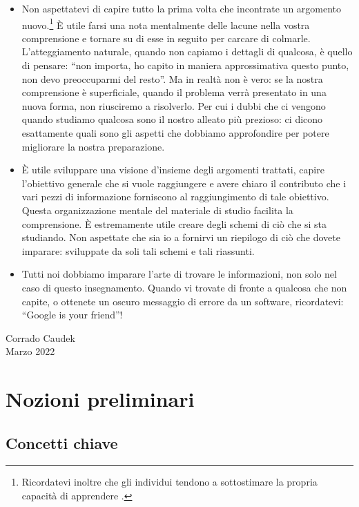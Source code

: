 \documentclass[
  11pt,
]{krantz}
\theoremstyle{definition}
\theoremstyle{definition}
\theoremstyle{definition}
\theoremstyle{definition}
\theoremstyle{remark}
\begin{document}
\begin{itemize}
\item
  Non aspettatevi di capire tutto la prima volta che incontrate un argomento nuovo.\footnote{Ricordatevi inoltre che gli individui tendono a sottostimare la propria capacità di apprendere \citep{horn2021underestimating}.} È utile farsi una nota mentalmente delle lacune nella vostra comprensione e tornare su di esse in seguito per carcare di colmarle. L'atteggiamento naturale, quando non capiamo i dettagli di qualcosa, è quello di pensare: ``non importa, ho capito in maniera approssimativa questo punto, non devo preoccuparmi del resto''. Ma in realtà non è vero: se la nostra comprensione è superficiale, quando il problema verrà presentato in una nuova forma, non riusciremo a risolverlo. Per cui i dubbi che ci vengono quando studiamo qualcosa sono il nostro alleato più prezioso: ci dicono esattamente quali sono gli aspetti che dobbiamo approfondire per potere migliorare la nostra preparazione.
\item
  È utile sviluppare una visione d'insieme degli argomenti trattati, capire l'obiettivo generale che si vuole raggiungere e avere chiaro il contributo che i vari pezzi di informazione forniscono al raggiungimento di tale obiettivo. Questa organizzazione mentale del materiale di studio facilita la comprensione. È estremamente utile creare degli schemi di ciò che si sta studiando. Non aspettate che sia io a fornirvi un riepilogo di ciò che dovete imparare: sviluppate da soli tali schemi e tali riassunti.
\item
  Tutti noi dobbiamo imparare l'arte di trovare le informazioni, non solo nel caso di questo insegnamento. Quando vi trovate di fronte a qualcosa che non capite, o ottenete un oscuro messaggio di errore da un software, ricordatevi: ``Google is your friend''!
\end{itemize}

\begin{flushright}
Corrado Caudek\\
Marzo 2022 \end{flushright}

\mainmatter

\hypertarget{part-nozioni-preliminari}{%
\part{Nozioni preliminari}\label{part-nozioni-preliminari}}

\hypertarget{concetti-chiave}{%
\chapter{Concetti chiave}\label{concetti-chiave}}
\end{document}
